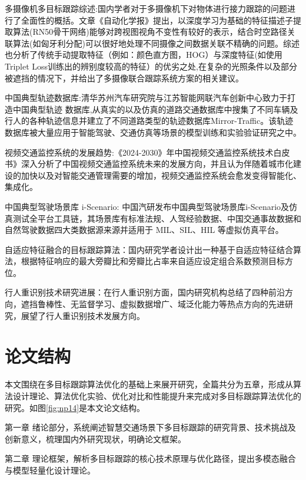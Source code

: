多摄像机多目标跟踪综述:国内学者对于多摄像机下对物体进行接力跟踪的问题进行了全面性的概括。文章《自动化学报》提出\cite{wang2023research}，以深度学习为基础的特征描述子提取算法(RN50骨干网络)能够对跨视图视角不变性有较好的表示，结合时空路径关联算法(如匈牙利分配)可以很好地处理不同摄像之间数据关联不精确的问题。综述也分析了传统手动提取特征（例如：颜色直方图，HOG）与深度特征(如使用Triplet Loss训练出的辨别度较高的特征）的优劣之处,在复杂的光照条件以及部分被遮挡的情况下，并给出了多摄像联合跟踪系统方案的相关建议。


中国典型轨迹数据库:清华苏州汽车研究院与江苏智能网联汽车创新中心致力于打造中国典型轨迹 数据库,从真实的以及仿真的道路交通数据库中搜集了不同车辆及行人的各种轨迹信息并建立了不同道路类型的轨迹数据库Mirror-Traffic\cite{tsinghua2021mirrortraffic}。该轨迹数据库被大量应用于智能驾驶、交通仿真等场景的模型训练和实验验证研究之中。

视频交通监控系统的发展趋势:《2024-2030》年中国视频交通监控系统技术白皮书》\cite{cetc2024whitepaper}深入分析了中国视频交通监控系统未来的发展方向，并且认为伴随着城市化建设的加快以及对智能交通管理需要的增加，视频交通监控系统会愈发变得智能化、集成化。

中国典型驾驶场景库 i-Scenario: 中国汽研发布中国典型驾驶场景库i-Scenario及仿真测试全平台工具链，其场景库有标准法规、人驾经验数据、中国交通事故数据和自然驾驶数据四大类数据源来源并适用于 MIL、SIL、HIL 等虚拟仿真平台。

自适应特征融合的目标跟踪算法：国内研究学者设计出一种基于自适应特征结合算法，根据特征响应的最大旁瓣比和旁瓣比占率来自适应设定组合系数预测目标方位\cite{chen2023adaptive}。


行人重识别技术研究进展：在行人重识别方面，国内研究机构总结了四种前沿方向\cite{li2023progress}，遮挡鲁棒性、无监督学习、虚拟数据增广、域泛化能力等热点方向的先进研究，展望了行人重识别技术发展方向。





\section{论文结构}
本文围绕在多目标跟踪算法优化的基础上来展开研究，全篇共分为五章，形成从算法设计理论、算法优化实验、优化对比和性能提升来完成对多目标跟踪算法优化的研究。如图\ref{fig:np14}是本文论文结构。

第一章 绪论部分，系统阐述智慧交通场景下多目标跟踪的研究背景、技术挑战及创新意义，梳理国内外研究现状，明确论文框架。

第二章 理论框架，解析多目标跟踪的核心技术原理与优化路径，提出多模态融合与模型轻量化设计理论。

